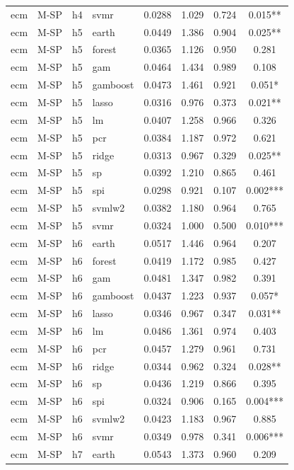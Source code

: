\begin{ThreePartTable}
\begin{longtable}[t]{llclcccc}
ecm & M-SP & h4 & svmr & 0.0288 & 1.029 & 0.724 & 0.015**\\
\addlinespace
ecm & M-SP & h5 & earth & 0.0449 & 1.386 & 0.904 & 0.025**\\
ecm & M-SP & h5 & forest & 0.0365 & 1.126 & 0.950 & 0.281\\
ecm & M-SP & h5 & gam & 0.0464 & 1.434 & 0.989 & 0.108\\
ecm & M-SP & h5 & gamboost & 0.0473 & 1.461 & 0.921 & 0.051*\\
ecm & M-SP & h5 & lasso & 0.0316 & 0.976 & 0.373 & 0.021**\\
ecm & M-SP & h5 & lm & 0.0407 & 1.258 & 0.966 & 0.326\\
ecm & M-SP & h5 & pcr & 0.0384 & 1.187 & 0.972 & 0.621\\
ecm & M-SP & h5 & ridge & 0.0313 & 0.967 & 0.329 & 0.025**\\
ecm & M-SP & h5 & sp & 0.0392 & 1.210 & 0.865 & 0.461\\
ecm & M-SP & h5 & spi & 0.0298 & 0.921 & 0.107 & 0.002***\\
ecm & M-SP & h5 & svmlw2 & 0.0382 & 1.180 & 0.964 & 0.765\\
ecm & M-SP & h5 & svmr & 0.0324 & 1.000 & 0.500 & 0.010***\\
\addlinespace
ecm & M-SP & h6 & earth & 0.0517 & 1.446 & 0.964 & 0.207\\
ecm & M-SP & h6 & forest & 0.0419 & 1.172 & 0.985 & 0.427\\
ecm & M-SP & h6 & gam & 0.0481 & 1.347 & 0.982 & 0.391\\
ecm & M-SP & h6 & gamboost & 0.0437 & 1.223 & 0.937 & 0.057*\\
ecm & M-SP & h6 & lasso & 0.0346 & 0.967 & 0.347 & 0.031**\\
ecm & M-SP & h6 & lm & 0.0486 & 1.361 & 0.974 & 0.403\\
ecm & M-SP & h6 & pcr & 0.0457 & 1.279 & 0.961 & 0.731\\
ecm & M-SP & h6 & ridge & 0.0344 & 0.962 & 0.324 & 0.028**\\
ecm & M-SP & h6 & sp & 0.0436 & 1.219 & 0.866 & 0.395\\
ecm & M-SP & h6 & spi & 0.0324 & 0.906 & 0.165 & 0.004***\\
ecm & M-SP & h6 & svmlw2 & 0.0423 & 1.183 & 0.967 & 0.885\\
ecm & M-SP & h6 & svmr & 0.0349 & 0.978 & 0.341 & 0.006***\\
\addlinespace
ecm & M-SP & h7 & earth & 0.0543 & 1.373 & 0.960 & 0.209\\

\end{longtable}
\end{ThreePartTable}
